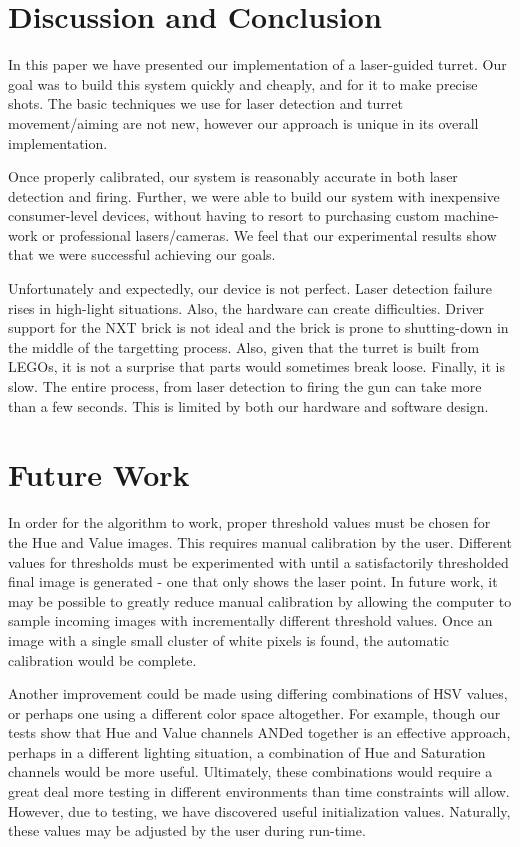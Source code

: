 \documentclass[10pt,twocolumn,letterpaper]{article}
\begin{document}
\section{Discussion and Conclusion}

In this paper we have presented our implementation of a laser-guided turret.  Our goal was to build this system quickly and cheaply, and for it to make precise shots.  The basic techniques we use for laser detection and turret movement/aiming are not new, however our approach is unique in its overall implementation.

Once properly calibrated, our system is reasonably accurate in both laser detection and firing.  Further, we were able to build our system with inexpensive consumer-level devices, without having to resort to purchasing custom machine-work or professional lasers/cameras.  We feel that our experimental results show that we were successful achieving our goals.

Unfortunately and expectedly, our device is not perfect.  Laser detection failure rises in high-light situations.  Also, the hardware can create difficulties.  Driver support for the NXT brick is not ideal and the brick is prone to shutting-down in the middle of the targetting process.  Also, given that the turret is built from LEGOs, it is not a surprise that parts would sometimes break loose.  Finally, it is slow.  The entire process, from laser detection to firing the gun can take more than a few seconds.  This is limited by both our hardware and software design.  

\section{Future Work}

In order for the algorithm to work, proper threshold values must be chosen for the Hue and Value images.  This requires manual calibration by the user.  Different values for thresholds must be experimented with until a satisfactorily thresholded final image is generated - one that only shows the laser point.  In future work, it may be possible to greatly reduce manual calibration by allowing the computer to sample incoming images with incrementally different threshold values.  Once an image with a single small cluster of white pixels is found, the automatic calibration would be complete.

Another improvement could be made using differing combinations of HSV values, or perhaps one using a different color space altogether.  For example, though our tests show that Hue and Value channels ANDed together is an effective approach, perhaps in a different lighting situation, a combination of Hue and Saturation channels would be more useful.  Ultimately, these combinations would require a great deal more testing in different environments than time constraints will allow.  However, due to testing, we have discovered useful initialization values.  Naturally, these values may be adjusted by the user during run-time.
\end{document}
